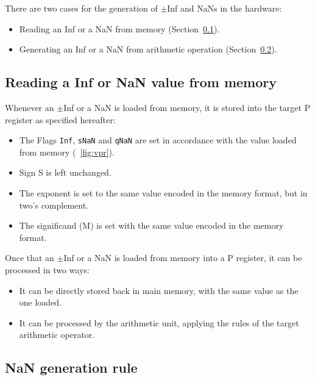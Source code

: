There are two cases for the generation of $\pm$Inf and NaNs in the hardware:

\begin{itemize}[topsep=0pt]
    \item Reading an Inf or a NaN from memory (Section~\ref{sec:nanmem}).
    \item Generating an Inf or a NaN from arithmetic operation (Section~\ref{sec:nangen}).
\end{itemize}

\subsection{ Reading a Inf or NaN value from memory}

\label{sec:nanmem}

Whenever an $\pm$Inf or a NaN is loaded from memory, it is stored into the target P register as specified hereafter:
\begin{itemize}[topsep=0pt]
    \item The Flags \texttt{Inf}, \texttt{sNaN} and \texttt{qNaN} are set in accordance with the value loaded from memory (\figurename~\ref{fig:vpr}).
    \item Sign S is left unchanged.
    \item The exponent is set to the same value encoded in the memory format, but in two's complement.
    \item The significand (M) is set with the same value encoded in the memory format.
\end{itemize}

Once that an $\pm$Inf or a NaN is loaded from memory into a P register, it can be processed in two ways:
\begin{itemize}[topsep=0pt]
    \item It can be directly stored back in main memory, with the same value as the one loaded.
    \item It can be processed by the arithmetic unit, applying the rules of the target arithmetic operator.
\end{itemize}

\subsection{NaN generation rule}

\label{sec:nangen}

